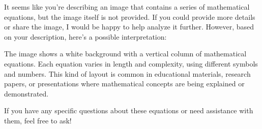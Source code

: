 It seems like you're describing an image that contains a series of mathematical equations, but the image itself is not provided. If you could provide more details or share the image, I would be happy to help analyze it further. However, based on your description, here's a possible interpretation:

The image shows a white background with a vertical column of mathematical equations. Each equation varies in length and complexity, using different symbols and numbers. This kind of layout is common in educational materials, research papers, or presentations where mathematical concepts are being explained or demonstrated.

If you have any specific questions about these equations or need assistance with them, feel free to ask!